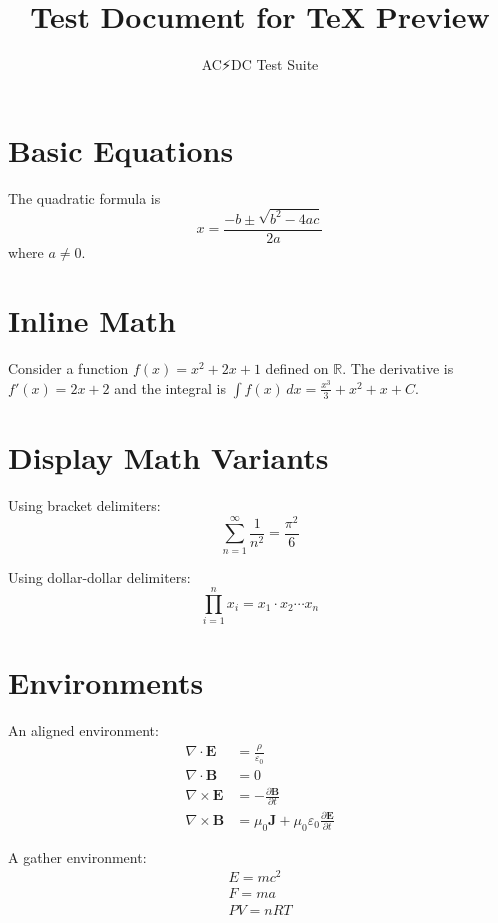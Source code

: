 \documentclass{article}
\title{Test Document for TeX Preview}
\author{AC⚡DC Test Suite}
\date{}
\begin{document}
\maketitle

\section{Basic Equations}

The quadratic formula is
\begin{equation}
x = \frac{-b \pm \sqrt{b^2 - 4ac}}{2a}
\label{eq:quadratic}
\end{equation}
where $a \neq 0$.

\section{Inline Math}

Consider a function $f(x) = x^2 + 2x + 1$ defined on $\mathbb{R}$.
The derivative is $f'(x) = 2x + 2$ and the integral is
$\int f(x)\,dx = \frac{x^3}{3} + x^2 + x + C$.

\section{Display Math Variants}

Using bracket delimiters:
\[
\sum_{n=1}^{\infty} \frac{1}{n^2} = \frac{\pi^2}{6}
\]

Using dollar-dollar delimiters:
$$
\prod_{i=1}^{n} x_i = x_1 \cdot x_2 \cdots x_n
$$

\section{Environments}

An aligned environment:
\begin{align}
\nabla \cdot \mathbf{E} &= \frac{\rho}{\varepsilon_0} \\
\nabla \cdot \mathbf{B} &= 0 \\
\nabla \times \mathbf{E} &= -\frac{\partial \mathbf{B}}{\partial t} \\
\nabla \times \mathbf{B} &= \mu_0 \mathbf{J} + \mu_0 \varepsilon_0 \frac{\partial \mathbf{E}}{\partial t}
\end{align}

A gather environment:
\begin{gather}
E = mc^2 \\
F = ma \\
PV = nRT
\end{gather}
\end{document}
